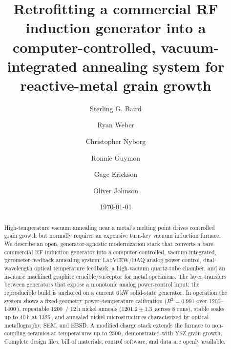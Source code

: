 \documentclass[%
 aip,
 rsi,%
 amsmath,amssymb,
 reprint,%
]{revtex4-2}
\newif\ifdraftnotes
\newcommand{\todo}[1]{\ifdraftnotes{\color{red}\textbf{[TODO: #1]}}\fi}
\begin{document}
\title{Retrofitting a commercial RF induction generator into a
computer-controlled, vacuum-integrated annealing system for reactive-metal
grain growth}

\author{Sterling G. Baird}
\author{Ryan Weber}
\author{Christopher Nyborg}
\author{Ronnie Guymon}
\author{Gage Erickson}
\author{Oliver Johnson}%

\date{\today}

\begin{abstract}
High-temperature vacuum annealing near a metal's melting point drives
controlled grain growth but normally requires an expensive turn-key vacuum
induction furnace. We describe an open, generator-agnostic modernization stack
that converts a bare commercial RF induction generator into a
computer-controlled, vacuum-integrated, pyrometer-feedback annealing system:
LabVIEW/DAQ analog power control, dual-wavelength optical temperature
feedback, a high-vacuum quartz-tube chamber, and an in-house machined graphite
crucible/susceptor for metal specimens. The layer transfers between generators
that expose a monotonic analog power-control input; the reproducible build is
anchored on a current 6\,kW solid-state generator. In operation the system
shows a fixed-geometry power--temperature calibration ($R^2 = 0.991$ over
1200--1400\,\celsius), repeatable 1200\,\celsius{} / 12\,h nickel anneals
($1201.2 \pm 1.3$\,\celsius{} across 8 runs), stable soaks up to 40\,h at
1325\,\celsius, and annealed-nickel microstructures characterized by optical
metallography, SEM, and EBSD. A modified charge stack extends the furnace to
non-coupling ceramics at temperatures up to 2500\,\celsius, demonstrated with
YSZ grain growth. Complete design files, bill of materials, control software,
and data are openly available.
\end{abstract}
\end{document}
